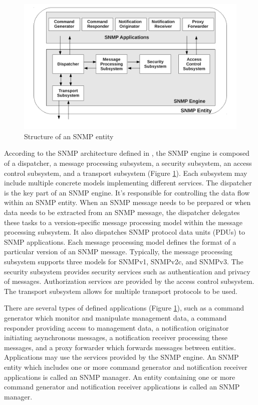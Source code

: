 \begin{figure}[htp]	
\begin{center}
    \includegraphics[scale = 0.6]{img/snmp-arch.pdf}
    \caption{Structure of an SNMP entity}   
	\label{fig:snmparch}
\end{center}
\end{figure}

According to the SNMP architecture defined in \cite{rfc3411}, the SNMP engine is composed of a dispatcher, a message processing subsystem, a security subsystem, an access control subsystem, and a transport subsystem (Figure \ref{fig:snmparch}). Each subsystem may include multiple concrete models implementing different services. The dispatcher is the key part of an SNMP engine. It's responsible for controlling the data flow within an SNMP entity. When an SNMP message needs to be prepared or when data needs to be extracted from an SNMP message, the dispatcher delegates these tasks to a version-specific message processing model within the message processing subsystem. It also dispatches SNMP  protocol data units (PDUs) to SNMP applications. Each message processing model defines the format of a particular version of an SNMP message. Typically, the message processing subsystem supports three models for SNMPv1, SNMPv2c, and SNMPv3. The security subsystem provides security services such as authentication and privacy of messages. Authorization services are provided by the access control subsystem. The transport subsystem \cite{rfc5590} allows for multiple transport protocols to be used.

There are several types of defined applications (Figure \ref{fig:snmparch}), such as a command generator which monitor and manipulate management data, a command responder providing access to management data, a notification originator initiating asynchronous messages, a notification receiver processing these messages, and a proxy forwarder which forwards messages between entities. Applications may use the services provided by the SNMP engine. An SNMP entity which includes one or more command generator and notification receiver applications is called an SNMP manager. An entity containing one or more command generator and notification receiver applications is called an SNMP manager.
